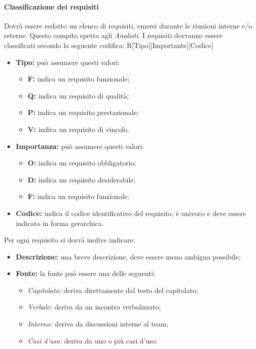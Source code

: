 \paragraph{Classificazione dei requisiti}
Dovrà essere redatto un elenco di requisiti, emersi durante le riunioni interne 
e/o esterne. Questo compito spetta agli \textsl{Analisti}. I requisiti dovranno 
essere classificati secondo la seguente codifica:
R[Tipo][Importante][Codice]

\begin{itemize} 
  \item \textbf{Tipo:} può assumere questi valori:
  \begin{itemize}
    \item \textbf{F:} indica un requisito funzionale;
    \item \textbf{Q:} indica un requisito di qualità;
    \item \textbf{P:} indica un requisito prestazionale;
    \item \textbf{V:} indica un requisito di vincolo.
  \end{itemize}
  \item \textbf{Importanza:} può assumere questi valori:
  \begin{itemize}
    \item \textbf{O:} indica un requisito obbligatorio;
    \item \textbf{D:} indica un requisito desiderabile;
    \item \textbf{F:} indica un requisito funzionale.
  \end{itemize}
  \item \textbf{Codice:} indica il codice identificativo del requisito, è 
  univoco e deve essere indicato in forma gerarchica.
\end{itemize}
Per ogni requisito si dovrà inoltre indicare: 
\begin{itemize}
  \item \textbf{Descrizione:} una breve descrizione, deve essere meno ambigua possibile;
  \item \textbf{Fonte:} la fonte può essere una delle seguenti:
  \begin{itemize}
    \item \textsl{Capitolato:} deriva direttamente dal testo del capitolato;
    \item \textsl{Verbale:} deriva da un incontro verbalizzato;
    \item \textsl{Interno:} deriva da discussioni interne al team;
    \item \textsl{Casi d'uso:} deriva da uno o più casi d'uso.
  \end{itemize}
\end{itemize} 
